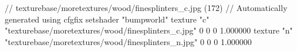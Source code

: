 // texturebase/moretextures/wood/finesplinters_c.jpg (172)
// Automatically generated using cfgfix
setshader "bumpworld"
texture "c" "texturebase/moretextures/wood/finesplinters_c.jpg" 0 0 0 1.000000
texture "n" "texturebase/moretextures/wood/finesplinters_n.jpg" 0 0 0 1.000000
